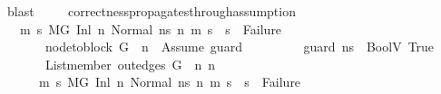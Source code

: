 \begin{isabellebody}
\ blast\ \isanewline
\ \ \isamarkupfalse%
\isanewline
{}\isamarkupfalse%
%
\endisatagproof
{\isafoldproof}%
%
\isadelimproof
\isanewline
%
\endisadelimproof
\isanewline
{}\isamarkupfalse%
\ correctness{\isacharunderscore}{\kern0pt}propagates{\isacharunderscore}{\kern0pt}through{\isacharunderscore}{\kern0pt}assumption{}{\isacharcolon}{\kern0pt}\isanewline
\ \ \ {\isachardoublequoteopen}{\isasymforall}m\ s{\isachardot}{\kern0pt}\ {\isacharparenleft}{\kern0pt}M{\isacharcomma}{\kern0pt}{\isasymLambda}{\isacharcomma}{\kern0pt}{\isasymGamma}{\isacharcomma}{\kern0pt}{\isasymOmega}{\isacharcomma}{\kern0pt}G\ {\isasymturnstile}{\isacharparenleft}{\kern0pt}Inl\ n{}{\isacharcomma}{\kern0pt}\ Normal\ ns{}{\isacharparenright}{\kern0pt}\ {\isacharminus}{\kern0pt}n{\isasymrightarrow}{\isacharasterisk}{\kern0pt}\ {\isacharparenleft}{\kern0pt}m{\isacharcomma}{\kern0pt}\ s{\isacharparenright}{\kern0pt}{\isacharparenright}{\kern0pt}\ {\isasymlongrightarrow}\ s\ {\isasymnoteq}\ Failure{\isachardoublequoteclose}\isanewline
\ \ \ \ \ \ \ {\isachardoublequoteopen}node{\isacharunderscore}{\kern0pt}to{\isacharunderscore}{\kern0pt}block\ G\ {\isacharbang}{\kern0pt}\ n{}\ {\isacharequal}{\kern0pt}\ {\isacharbrackleft}{\kern0pt}Assume\ guard{\isacharbrackright}{\kern0pt}{\isachardoublequoteclose}\isanewline
\ \ \ \ \ \ \ {\isachardoublequoteopen}{\isasymLambda}{\isacharcomma}{\kern0pt}{\isasymGamma}{\isacharcomma}{\kern0pt}{\isasymOmega}\ {\isasymturnstile}\ {\isasymlangle}guard{\isacharcomma}{\kern0pt}\ ns{}{\isasymrangle}\ {\isasymDown}\ BoolV\ True{\isachardoublequoteclose}\isanewline
\ \ \ \ \ \ \ {\isachardoublequoteopen}List{\isachardot}{\kern0pt}member\ {\isacharparenleft}{\kern0pt}out{\isacharunderscore}{\kern0pt}edges\ G\ {\isacharbang}{\kern0pt}\ n{}{\isacharparenright}{\kern0pt}\ n{}{\isachardoublequoteclose}\isanewline
\ \ \ \ \ {\isachardoublequoteopen}{\isasymAnd}\ m\ s{\isachardot}{\kern0pt}\ {\isacharparenleft}{\kern0pt}M{\isacharcomma}{\kern0pt}{\isasymLambda}{\isacharcomma}{\kern0pt}{\isasymGamma}{\isacharcomma}{\kern0pt}{\isasymOmega}{\isacharcomma}{\kern0pt}G\ {\isasymturnstile}{\isacharparenleft}{\kern0pt}Inl\ n{}{\isacharcomma}{\kern0pt}\ Normal\ ns{}{\isacharparenright}{\kern0pt}\ {\isacharminus}{\kern0pt}n{\isasymrightarrow}{\isacharasterisk}{\kern0pt}\ {\isacharparenleft}{\kern0pt}m{\isacharcomma}{\kern0pt}\ s{\isacharparenright}{\kern0pt}{\isacharparenright}{\kern0pt}\ {\isasymLongrightarrow}\ s\ {\isasymnoteq}\ Failure{\isachardoublequoteclose}\isanewline

\end{isabellebody}
